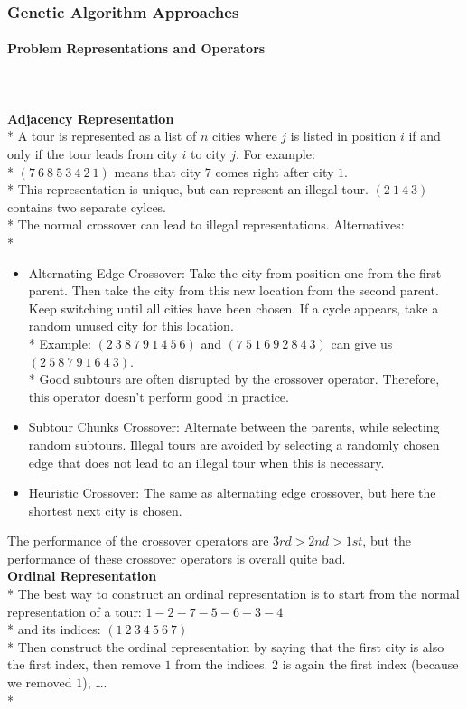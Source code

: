 \documentclass[12pt]{article}
\newcommand{\myparagraph}[1]{\paragraph{#1}\mbox{}\\\\}
\newcommand{\mysubparagraph}[1]{\textbf{#1}\mbox{}\\*}
\begin{document}
\subsubsection{Genetic Algorithm Approaches}
\myparagraph{Problem Representations and Operators}
\mysubparagraph{Adjacency Representation}
A tour is represented as a list of $n$ cities where $j$ is listed in position $i$ if and only if the tour leads from city $i$ to city $j$. For example:\\*
$(7\ 6\ 8\ 5\ 3\ 4\ 2\ 1)$ means that city $7$ comes right after city $1$.\\*
This representation is unique, but can represent an illegal tour. $(2\ 1\ 4\ 3)$ contains two separate cylces.\\*
The normal crossover can lead to illegal representations. Alternatives:\\*
\begin{itemize}
\item Alternating Edge Crossover: Take the city from position one from the first parent. Then take the city from this new location from the second parent. Keep switching until all cities have been chosen. If a cycle appears, take a random unused city for this location.\\*
Example: $(2\ 3\ 8\ 7\ 9\ 1\ 4\ 5\ 6)$ and $(7\ 5\ 1\ 6\ 9\ 2\ 8\ 4\ 3)$ can give us $(2\ 5\ 8\ 7\ 9\ 1\ 6\ 4\ 3)$.\\*
Good subtours are often disrupted by the crossover operator. Therefore, this operator doesn't perform good in practice.
\item Subtour Chunks Crossover: Alternate between the parents, while selecting random subtours. Illegal tours are avoided by selecting a randomly chosen edge that does not lead to an illegal tour when this is necessary.
\item Heuristic Crossover: The same as alternating edge crossover, but here the shortest next city is chosen.
\end{itemize}
The performance of the crossover operators are $3rd > 2nd > 1st$, but the performance of these crossover operators is overall quite bad.\\
\mysubparagraph{Ordinal Representation}
The best way to construct an ordinal representation is to start from the normal representation of a tour: $1-2-7-5-6-3-4$\\*
and its indices:
$(1\ 2\ 3\ 4\ 5\ 6\ 7)$\\*
Then construct the ordinal representation by saying that the first city is also the first index, then remove $1$ from the indices. $2$ is again the first index (because we removed $1$), \dots.\\*
\end{document}
